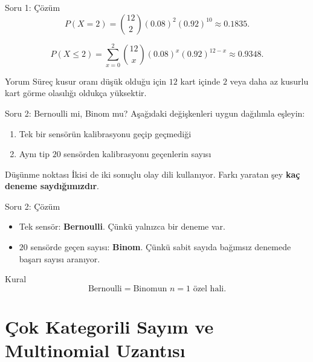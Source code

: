 \documentclass[light]{lutbeamer}
\begin{document}
\begin{frame}{Soru 1: Çözüm}
    \small
    \[
    P(X=2)=\binom{12}{2}(0.08)^2(0.92)^{10}\approx 0.1835.
    \]

    \[
    P(X\le 2)=\sum_{x=0}^{2}\binom{12}{x}(0.08)^x(0.92)^{12-x}\approx 0.9348.
    \]

    \begin{exampleblock}{Yorum}
        Süreç kusur oranı düşük olduğu için \(12\) kart içinde \(2\) veya daha az kusurlu kart görme olasılığı oldukça yüksektir.
    \end{exampleblock}
\end{frame}

\begin{frame}{Soru 2: Bernoulli mi, Binom mu?}
    \small
    Aşağıdaki değişkenleri uygun dağılımla eşleyin:
    \begin{enumerate}
        \item[(i)] Tek bir sensörün kalibrasyonu geçip geçmediği
        \item[(ii)] Aynı tip \(20\) sensörden kalibrasyonu geçenlerin sayısı
    \end{enumerate}

    \begin{alertblock}{Düşünme noktası}
        İkisi de iki sonuçlu olay dili kullanıyor. Farkı yaratan şey \textbf{kaç deneme saydığımızdır}.
    \end{alertblock}
\end{frame}

\begin{frame}{Soru 2: Çözüm}
    \small
    \begin{itemize}
        \item[(i)] Tek sensör: \textbf{Bernoulli}. Çünkü yalnızca bir deneme var.
        \item[(ii)] \(20\) sensörde geçen sayısı: \textbf{Binom}. Çünkü sabit sayıda bağımsız denemede başarı sayısı aranıyor.
    \end{itemize}

    \begin{block}{Kural}
        \[
        \text{Bernoulli} = \text{Binomun } n=1 \text{ özel hali.}
        \]
    \end{block}
\end{frame}

\section{Çok Kategorili Sayım ve Multinomial Uzantısı}
\end{document}
